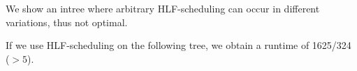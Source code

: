 \documentclass[letter]{report}
\begin{document}
We show an intree where arbitrary HLF-scheduling can occur in different variations, thus not optimal.

If we use HLF-scheduling on the following tree, we obtain a runtime of 1625/324 ($>5$).

\end{document}
